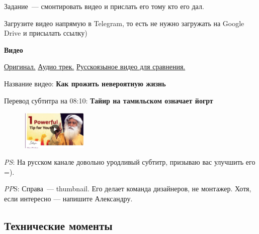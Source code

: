 \documentclass[
a4paper, %
12pt, %
article,
onecolumn, %
openany, %
]{memoir}
\begin{document}
Задание~--- смонтировать видео и прислать его тому кто его дал. 

Загрузите видео напрямую в Telegram, то есть не нужно 
загружать на Google Drive и присылать ссылку)

\begin{center} \textbf{Видео} \end{center}
\href{https://www.youtube.com/watch?v=9sGJUR7stzc}{Оригинал.}
\quad
\href{https://drive.google.com/file/d/1Y6ECjMSvkaUFmNawIePfFvqS2ZnB3SPi/view?usp=sharing}{Аудио трек.}
\quad
\href{https://www.youtube.com/watch?v=Q3NYDF4JyTg}{Русскоязыное видео для сравнения.}

Название видео: \textbf{Как прожить невероятную жизнь}
	
Перевод субтитра на 08:10: \textbf{Тайир на тамильском означает йогрт}


\begin{figure}
  \begin{center}
    \includegraphics[width=0.28\textwidth]{thumbnail}
  \end{center}
\end{figure}

\emph{PS}: На русском канале довольно уродливый субтитр, призываю вас улучшить его =).

\emph{PP}S: Справа~--- thumbnail. Его делает команда дизайнеров, не монтажер.
Хотя, если интересно — напишите Александру.


\newpage
\subsection{Технические моменты}
\end{document}
